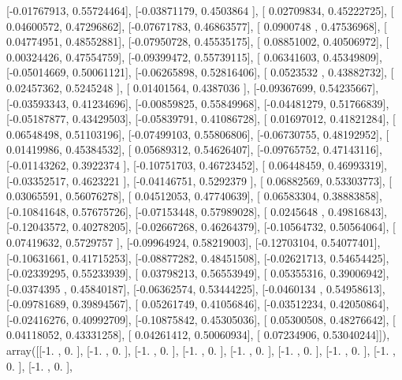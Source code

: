 \documentclass{article}
\begin{document}
       [-0.01767913,  0.55724464],
       [-0.03871179,  0.4503864 ],
       [ 0.02709834,  0.45222725],
       [ 0.04600572,  0.47296862],
       [-0.07671783,  0.46863577],
       [ 0.0900748 ,  0.47536968],
       [ 0.04774951,  0.48552881],
       [-0.07950728,  0.45535175],
       [ 0.08851002,  0.40506972],
       [ 0.00324426,  0.47554759],
       [-0.09399472,  0.55739115],
       [ 0.06341603,  0.45349809],
       [-0.05014669,  0.50061121],
       [-0.06265898,  0.52816406],
       [ 0.0523532 ,  0.43882732],
       [ 0.02457362,  0.5245248 ],
       [ 0.01401564,  0.4387036 ],
       [-0.09367699,  0.54235667],
       [-0.03593343,  0.41234696],
       [-0.00859825,  0.55849968],
       [-0.04481279,  0.51766839],
       [-0.05187877,  0.43429503],
       [-0.05839791,  0.41086728],
       [ 0.01697012,  0.41821284],
       [ 0.06548498,  0.51103196],
       [-0.07499103,  0.55806806],
       [-0.06730755,  0.48192952],
       [ 0.01419986,  0.45384532],
       [ 0.05689312,  0.54626407],
       [-0.09765752,  0.47143116],
       [-0.01143262,  0.3922374 ],
       [-0.10751703,  0.46723452],
       [ 0.06448459,  0.46993319],
       [-0.03352517,  0.4623221 ],
       [-0.04146751,  0.5292379 ],
       [ 0.06882569,  0.53303773],
       [ 0.03065591,  0.56076278],
       [ 0.04512053,  0.47740639],
       [ 0.06583304,  0.38883858],
       [-0.10841648,  0.57675726],
       [-0.07153448,  0.57989028],
       [ 0.0245648 ,  0.49816843],
       [-0.12043572,  0.40278205],
       [-0.02667268,  0.46264379],
       [-0.10564732,  0.50564064],
       [ 0.07419632,  0.5729757 ],
       [-0.09964924,  0.58219003],
       [-0.12703104,  0.54077401],
       [-0.10631661,  0.41715253],
       [-0.08877282,  0.48451508],
       [-0.02621713,  0.54654425],
       [-0.02339295,  0.55233939],
       [ 0.03798213,  0.56553949],
       [ 0.05355316,  0.39006942],
       [-0.0374395 ,  0.45840187],
       [-0.06362574,  0.53444225],
       [-0.0460134 ,  0.54958613],
       [-0.09781689,  0.39894567],
       [ 0.05261749,  0.41056846],
       [-0.03512234,  0.42050864],
       [-0.02416276,  0.40992709],
       [-0.10875842,  0.45305036],
       [ 0.05300508,  0.48276642],
       [ 0.04118052,  0.43331258],
       [ 0.04261412,  0.50060934],
       [ 0.07234906,  0.53040244]]), array([[-1.        ,  0.        ],
       [-1.        ,  0.        ],
       [-1.        ,  0.        ],
       [-1.        ,  0.        ],
       [-1.        ,  0.        ],
       [-1.        ,  0.        ],
       [-1.        ,  0.        ],
       [-1.        ,  0.        ],
       [-1.        ,  0.        ],
\end{document}
